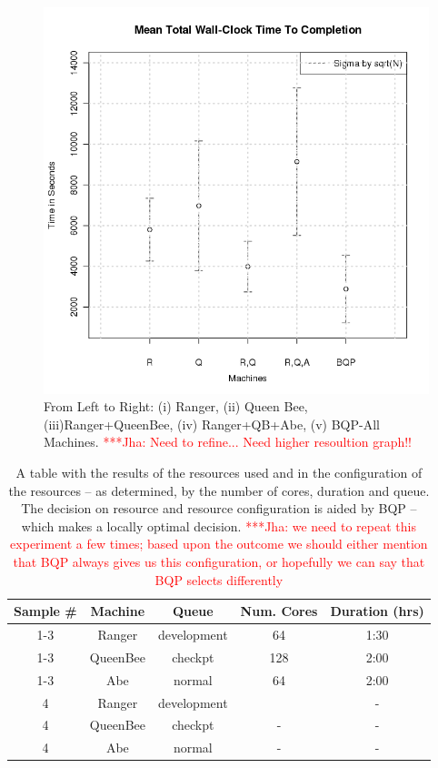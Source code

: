 \documentclass[conference,final]{IEEEtran}
\newcommand{\jhanote}[1]{ {\textcolor{red} { ***Jha: #1 }}}
\newcommand{\jhanote}[1]{}
\begin{document}
\begin{figure}
\begin{center}
\includegraphics[scale=0.34]{./figures/ErrorBarPlot.png}
\end{center}
\caption{From Left to Right: (i) Ranger, (ii) Queen Bee,
  (iii)Ranger+QueenBee, (iv) Ranger+QB+Abe, (v) BQP-All
  Machines. \jhanote{ Need to refine... Need higher resoultion graph!!}}
\label{fig:application_architecture}
\end{figure}

\begin{table}
\begin{tabular}{|c|c|c|c|c|}
\hline Sample \# & Machine & Queue & Num. Cores & Duration (hrs) \\ 
\hline 1-3 & Ranger & development & 64 & 1:30 \\ 
\hline 1-3 & QueenBee & checkpt & 128 & 2:00 \\ 
\hline 1-3 & Abe & normal & 64 & 2:00 \\ 
\hline 4 & Ranger & development &  & - \\ 
\hline 4 & QueenBee & checkpt & - & - \\ 
\hline 4 & Abe & normal & - & - \\ 
\hline 
\end{tabular} 
\caption{A table with the results of the resources used and in
  the configuration of the resources -- as determined, by the
  number of cores, duration and queue. The decision on
  resource and resource configuration is aided by BQP -- which 
  makes a locally optimal decision. \jhanote{we need to repeat
    this experiment a few times; based upon the outcome we should either
    mention that BQP always gives us this configuration, or hopefully we
    can say that BQP selects differently}}
\end{table}
\end{document}
